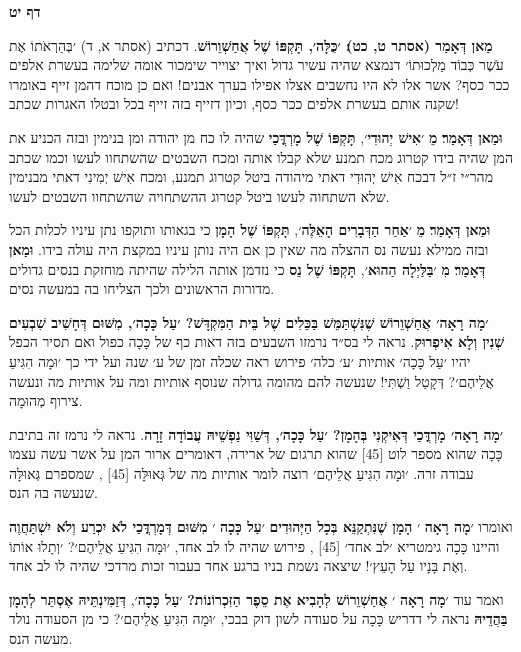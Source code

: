 \documentclass[12pt, openany]{book}
\newcommand{\sethebfont}{
\fontsize{10.5pt}{13.1pt} \selectfont
}
\newcommand{\textblock}[1]{
{\sethebfont #1\\}	
}
\newcommand{\sectname}{}
\newcommand{\newsection}[1]{
	\renewcommand{\sectname}{#1}	
	\vspace{-\baselineskip}
	\begin{center}
		\textbf{%
\fontsize{16pt}{16pt}\selectfont
			#1}
	\end{center}
	\vspace{-\baselineskip}
	\nopagebreak
}
\begin{document}
\clearpage
\newsection{דף יט}
\textblock{\textbf{מַאן דְּאָמַר {\small (אסתר ט, כט)}׃ ׳כֻּלָּה׳, תָּקְפּוֹ שֶׁל אֲחַשְׁוֵרוֹשׁ}. דכתיב {\small (אסתר א, ד)} ׳בְּהַרְאֹתוֹ אֶת עֹשֶׁר כְּבוֹד מַלְכוּתוֹ׳ דנמצא שהיה עשיר גדול ואיך יצוייר שימכור אומה שלימה בעשרת אלפים ככר כסף? אשר אלו לא היו נחשבים אצלו אפילו בערך אבנים! ואם כן מוכח דהמן זייף באומרו שקנה אותם בעשרת אלפים ככר כסף, וכיון דזייף בזה זייף בכל ובטלו האגרות שכתב!\par \textbf{וּמַאן דְּאָמַר}׃ \textbf{מֵ} ׳\textbf{אִישׁ יְהוּדִי}׳, \textbf{תָּקְפּוֹ שֶׁל מָרְדֳּכַי} שהיה לו כח מן יהודה ומן בנימין ובזה הכניע את המן שהיה בידו קטרוג מכח תמנע שלא קבלו אותה ומכח השבטים שהשתחוו לעשו וכמו שכתב מהר״י ז״ל דבכח אִישׁ יְהוּדִי דאתי מיהודה ביטל קטרוג תמנע, ומכח אִישׁ יְמִינִי דאתי מבנימין שלא השתחוה לעשו ביטל קטרוג ההשתחויה שהשתחוו השבטים לעשו.\par \textbf{וּמַאן דְּאָמַר}׃ \textbf{מֵ} ׳\textbf{אַחַר הַדְּבָרִים הָאֵלֶּה}׳, \textbf{תָּקְפּוֹ שֶׁל הָמָן} כי בגאותו ותוקפו נתן עיניו לכלות הכל ובזה ממילא נעשה נס ההצלה מה שאין כן אם היה נותן עיניו במקצת היה עולה בידו. \textbf{וּמַאן דְּאָמַר}׃ \textbf{מִ} ׳\textbf{בַּלַּיְלָה הַהוּא}׳, \textbf{תָּקְפּוֹ שֶׁל נֵס} כי נזדמן אותה הלילה שהיתה מוחזקת בנסים גדולים מדורות הראשונים ולכך הצליחו בה במעשה נסים.}
\textblock{\textbf{׳מָה רָאָה׳ אֲחַשְׁוֵרוֹשׁ שֶׁנִּשְׁתַּמֵּשׁ בַּכֵּלִים שֶׁל בֵּית הַמִּקְדָּשׁ? ׳עַל כָּכָה׳, מִשּׁוּם דְּחָשִׁיב שִׁבְעִים שְׁנִין וְלָא אִיפְרוּק}. נראה לי בס״ד נרמזו השבעים בזה דאות כף של כָּכָה כפול ואם תסיר הכפל יהיו ׳עַל כָּכָה׳ אותיות ׳ע׳ כלה׳ פירוש ראה שכלה זמן של ע׳ שנה ועל ידי כך ׳וּמָה הִגִּיעַ אֲלֵיהֶם׳? דְּקָטַל וַשְׁתִּי! שנעשה להם מהומה גדולה שנוסף אותיות ומה על אותיות מה ונעשה צירוף מְהוּמָה.}
\textblock{\textbf{׳מָה רָאָה׳ מָרְדֳּכַי דְּאִיקְנִי בְּהָמָן? ׳עַל כָּכָה׳, דְּשַׁוִּי נַפְשֵׁיהּ עֲבוֹדָה זָרָה}. נראה לי נרמז זה בתיבת כָּכָה שהוא מספר לוט {\small [45]} שהוא תרגום של ארירה, דאומרים ארור המן על אשר עשה עצמו עבודה זרה. ׳וּמָה הִגִּיעַ אֲלֵיהֶם׳ רוצה לומר אותיות מה של גְּאוּלָּה {\small [45]} , שמספרם גְּאוּלָּה שנעשה בה הנס.\par ואומרו ׳\textbf{מָה רָאָה} ׳ \textbf{הָמָן שֶׁנִּתְקַנֵּא בְּכָל הַיְּהוּדִים} ׳\textbf{עַל כָּכָה} ׳ \textbf{מִשּׁוּם דְּמָרְדֳּכַי לֹא יִכְרַע וְלֹא יִשְׁתַּחֲוֶה} והיינו כָּכָה גימטריא ׳לב אחד׳ {\small [45]} , פירוש שהיה לו לב אחד, ׳וּמָה הִגִּיעַ אֲלֵיהֶם׳? ׳וְתָלוּ אוֹתוֹ וְאֶת בָּנָיו עַל הָעֵץ׳! שיצאה נשמת בניו ברגע אחד בעבור זכות מרדכי שהיה לו לב אחד.\par ואמר עוד ׳\textbf{מָה רָאָה} ׳ \textbf{אֲחַשְׁוֵרוֹשׁ לְהָבִיא אֶת סֵפֶר הַזִּכְרוֹנוֹת?} ׳\textbf{עַל כָּכָה}׳, \textbf{דְּזַמִּינְתֵּיהּ אֶסְתֵּר לְהָמָן בַּהֲדֵיהּ} נראה לי דדריש כָּכָה על סעודה לשון דוק בבכי, ׳וּמָה הִגִּיעַ אֲלֵיהֶם׳? כי מן הסעודה נולד מעשה הנס.}
\end{document}
